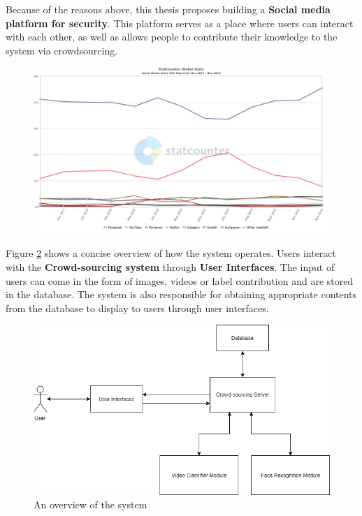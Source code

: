Because of the reasons above, this thesis proposes building a \textbf{Social media platform for security}. This platform serves as a place where users can interact with each other, as well as allows people to contribute their knowledge to the system via crowdsourcing.  
\begin{center}
    \begin{figure}[H]
    \centering
    \includegraphics[width=1\columnwidth]{images/chap3/social_media_vn.png}
    \label{chap3:social_media_vn}
    \end{figure}
\end{center}

Figure \ref{chap3:system_overview_basic} shows a concise overview of how the system operates. Users interact with the \textbf{Crowd-sourcing system} through \textbf{User Interfaces}. The input of users can come in the form of images, videos or label contribution and are stored in the database. The system is also responsible for obtaining appropriate contents from the database to display to users through user interfaces.

\begin{center}
    \begin{figure}[H]
    \centering
    \includegraphics[width=1\columnwidth]{images/chap3/system_overview_basic.png}
    \caption{An overview of the system}
    \label{chap3:system_overview_basic}
    \end{figure}
\end{center}

